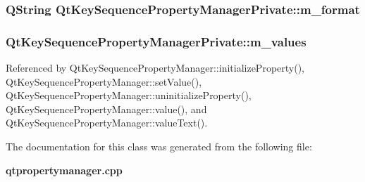 \subsubsection[{m\+\_\+format}]{\setlength{\rightskip}{0pt plus 5cm}Q\+String Qt\+Key\+Sequence\+Property\+Manager\+Private\+::m\+\_\+format}\label{classQtKeySequencePropertyManagerPrivate_a09b3412038bc98b9f8f7bef1dcdccb14}
\subsubsection[{m\+\_\+values}]{ Qt\+Key\+Sequence\+Property\+Manager\+Private\+::m\+\_\+values}\label{classQtKeySequencePropertyManagerPrivate_af3aa0ef5b7409c894e987c247e5ce149}


Referenced by Qt\+Key\+Sequence\+Property\+Manager\+::initialize\+Property(), Qt\+Key\+Sequence\+Property\+Manager\+::set\+Value(), Qt\+Key\+Sequence\+Property\+Manager\+::uninitialize\+Property(), Qt\+Key\+Sequence\+Property\+Manager\+::value(), and Qt\+Key\+Sequence\+Property\+Manager\+::value\+Text().



The documentation for this class was generated from the following file\+:\begin{DoxyCompactItemize}
\item 
{\bf qtpropertymanager.\+cpp}\end{DoxyCompactItemize}
